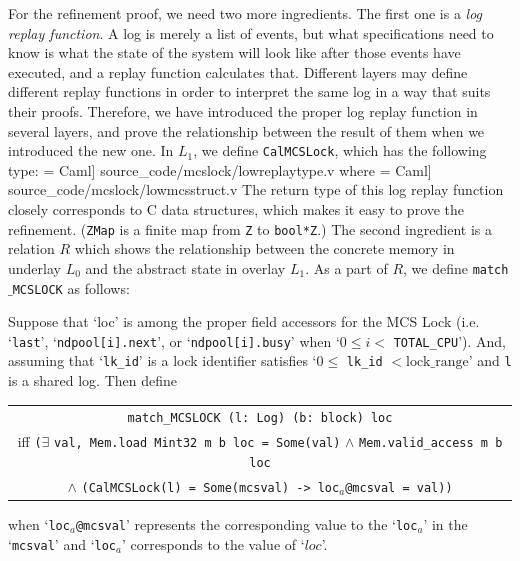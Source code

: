 For the refinement proof, we need two more ingredients.
The first one is a \emph{log replay function}.
A log is merely a list of events, but what specifications need to know is what the state of the system will look like after those events have executed,
and a replay function calculates that. 
Different layers may define different replay functions in order to interpret the same log in a way that suits their proofs.
Therefore, we have introduced the proper log replay function in several layers, and prove the relationship between the result of them when we introduced the new one.
In $L_1$, we define \texttt{CalMCSLock}, which has the following type:
 = Caml] {source_code/mcslock/lowreplaytype.v}
where
 = Caml] {source_code/mcslock/lowmcsstruct.v}
The return type of this log replay function closely corresponds to C data structures, which makes it easy to prove the refinement. (\lstinline$ZMap$ is a finite map from \lstinline$Z$ to \lstinline$bool*Z$.)
The second ingredient is a relation $R$ which shows the relationship between the concrete memory in underlay $L_0$ and the abstract state in overlay $L_1$.
As a part of $R$, we define \texttt{match$\_$MCSLOCK} as follows:


\begin{definition}
Suppose that `loc' is among the proper field accessors for the MCS Lock (i.e. `\lstinline$last$', `\lstinline$ndpool[i].next$', or  `\lstinline$ndpool[i].busy$' when `$0 \leq i <$  \lstinline$TOTAL_CPU$'). And, assuming that `\lstinline$lk_id$' is a lock identifier satisfies `$0 \leq$ \lstinline$lk_id$ $< \mathrm{lock\_range}$' and \lstinline$l$ is a shared log. Then define 

\begin{center}
  \begin{tabular}{c}
    \lstinline$match_MCSLOCK (l: Log) (b: block) loc$\\
iff \lstinline$($$\exists$ \lstinline$val, Mem.load Mint32 m b loc = Some(val)$ $\wedge$  \lstinline$Mem.valid_access m b loc$\\
$\wedge$ \lstinline$(CalMCSLock(l) = Some(mcsval) -> loc$$_{a}$\lstinline$@mcsval = val))$
\end{tabular}

\end{center}
when `\lstinline$loc$$_{a}$\lstinline$@mcsval$' represents the corresponding 
value to the `\lstinline$loc$$_{a}$' in the `\lstinline$mcsval$' 
and `\lstinline$loc$$_{a}$' corresponds to the value of `$loc$'.
\end{definition}

